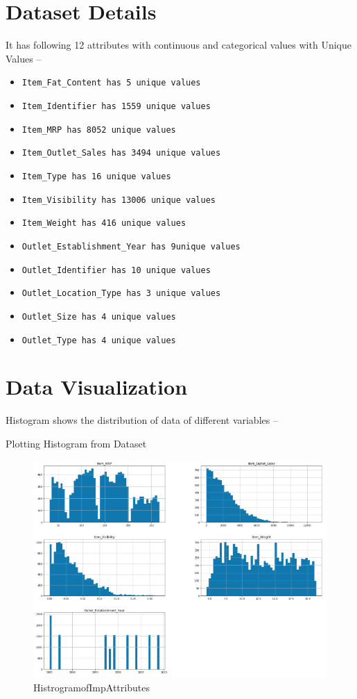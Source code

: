 \section{Dataset Details}
It has following 12 attributes with continuous and categorical values with Unique Values –
\begin{itemize}
\item \verb|Item_Fat_Content has 5 unique values|
\item \verb|Item_Identifier has 1559 unique values|
\item \verb|Item_MRP has 8052 unique values|
\item \verb|Item_Outlet_Sales has 3494 unique values|
\item \verb|Item_Type has 16 unique values|
\item \verb|Item_Visibility has 13006 unique values|
\item \verb|Item_Weight has 416 unique values|
\item \verb|Outlet_Establishment_Year has 9unique values|
\item \verb|Outlet_Identifier has 10 unique values|
\item \verb|Outlet_Location_Type has 3 unique values|
\item \verb|Outlet_Size has 4 unique values|
\item \verb|Outlet_Type has 4 unique values|
\end{itemize}


\section{Data Visualization}
Histogram shows the distribution of data of different variables –

Plotting Histogram from Dataset

\begin{figure}[pic1]
	\centering\includegraphics[width=\columnwidth]{Images/mlstudio/HistrogramofImpAttributes.png}
	\caption{HistrogramofImpAttributes}\label{fig:HistrogramofImpAttributes}
\end{figure}

